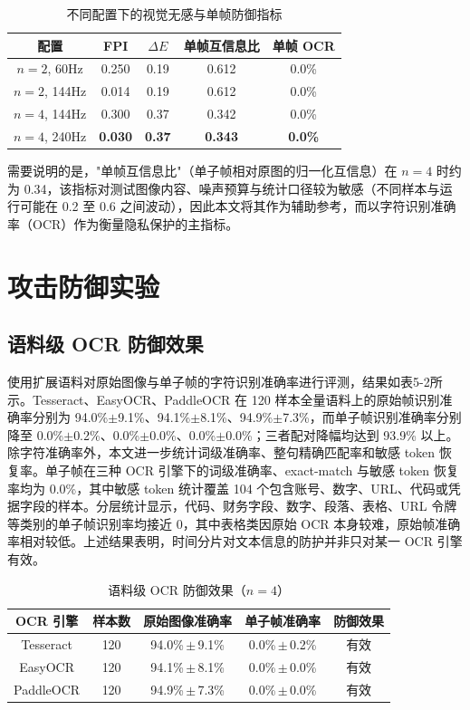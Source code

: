 \begin{table}[htbp]
  \centering
  \caption{不同配置下的视觉无感与单帧防御指标}
  \begin{tabular}{ccccc}
    \toprule
    配置 & FPI & $\Delta E$ & 单帧互信息比 & 单帧 OCR \\
    \midrule
    $n=2$, 60Hz   & 0.250 & 0.19 & 0.612 & 0.0\% \\
    $n=2$, 144Hz  & 0.014 & 0.19 & 0.612 & 0.0\% \\
    $n=4$, 144Hz  & 0.300 & 0.37 & 0.342 & 0.0\% \\
    $n=4$, 240Hz  & \textbf{0.030} & \textbf{0.37} & \textbf{0.343} & \textbf{0.0\%} \\
    \bottomrule
  \end{tabular}
\end{table}

需要说明的是，"单帧互信息比"（单子帧相对原图的归一化互信息）在 $n=4$ 时约为 0.34，该指标对测试图像内容、噪声预算与统计口径较为敏感（不同样本与运行可能在 0.2 至 0.6 之间波动），因此本文将其作为辅助参考，而以字符识别准确率（OCR）作为衡量隐私保护的主指标。

\section{攻击防御实验}

\subsection{语料级 OCR 防御效果}

使用扩展语料对原始图像与单子帧的字符识别准确率进行评测，结果如表5-2所示。Tesseract、EasyOCR、PaddleOCR 在 120 样本全量语料上的原始帧识别准确率分别为 94.0\%$\pm$9.1\%、94.1\%$\pm$8.1\%、94.9\%$\pm$7.3\%，而单子帧识别准确率分别降至 0.0\%$\pm$0.2\%、0.0\%$\pm$0.0\%、0.0\%$\pm$0.0\%；三者配对降幅均达到 93.9\% 以上。除字符准确率外，本文进一步统计词级准确率、整句精确匹配率和敏感 token 恢复率。单子帧在三种 OCR 引擎下的词级准确率、exact-match 与敏感 token 恢复率均为 0.0\%，其中敏感 token 统计覆盖 104 个包含账号、数字、URL、代码或凭据字段的样本。分层统计显示，代码、财务字段、数字、段落、表格、URL 令牌等类别的单子帧识别率均接近 0，其中表格类因原始 OCR 本身较难，原始帧准确率相对较低。上述结果表明，时间分片对文本信息的防护并非只对某一 OCR 引擎有效。

\begin{table}[htbp]
  \centering
  \caption{语料级 OCR 防御效果（$n=4$）}
  \begin{tabular}{ccccc}
    \toprule
    OCR 引擎 & 样本数 & 原始图像准确率 & 单子帧准确率 & 防御效果 \\
    \midrule
    Tesseract & 120 & 94.0\%\,$\pm$\,9.1\% & 0.0\%\,$\pm$\,0.2\% & 有效 \\
    EasyOCR   & 120 & 94.1\%\,$\pm$\,8.1\% & 0.0\%\,$\pm$\,0.0\% & 有效 \\
    PaddleOCR & 120 & 94.9\%\,$\pm$\,7.3\% & 0.0\%\,$\pm$\,0.0\% & 有效 \\
    \bottomrule
  \end{tabular}
\end{table}

